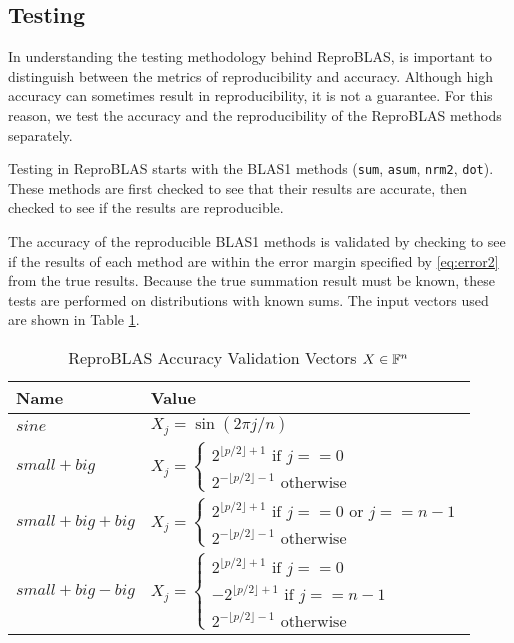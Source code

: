 \subsection{Testing}
  In understanding the testing methodology behind ReproBLAS, is important to distinguish between the metrics of reproducibility and accuracy. Although high accuracy can sometimes result in reproducibility, it is not a guarantee. For this reason, we test the accuracy and the reproducibility of the ReproBLAS methods separately.

  Testing in ReproBLAS starts with the BLAS1 methods (\texttt{sum}, \texttt{asum}, \texttt{nrm2}, \texttt{dot}). These methods are first checked to see that their results are accurate, then checked to see if the results are reproducible.

  The accuracy of the reproducible BLAS1 methods is validated by checking to see if the results of each method are within the error margin specified by \eqref{eq:error2} from the true results. Because the true summation result must be known, these tests are performed on distributions with known sums. The input vectors used are shown in Table \ref{tbl:validateblas1data}.

    \begin{table}[!htbp]
        \centering
        \begin{tabular}{ | l |  l |} \hline
            Name & Value\\ \hline
            $sine$ & $X_j = \sin(2 \pi j/n)$ \\ \hline
            $small + big$ & $X_j = \begin{cases} 2^{\lfloor p/2\rfloor + 1} \text{ if } j == 0 \\ 2^{-\lfloor p/2\rfloor - 1} \text{ otherwise} \end{cases}$ \\ \hline
            $small + big + big$ & $X_j = \begin{cases} 2^{\lfloor p/2\rfloor + 1} \text{ if } j == 0 \text{ or } j == n - 1 \\ 2^{-\lfloor p/2\rfloor - 1} \text{ otherwise} \end{cases}$\\ \hline
            $small + big - big$ & $X_j = \begin{cases} 2^{\lfloor p/2\rfloor + 1} \text{ if } j == 0\\-2^{\lfloor p/2\rfloor + 1} \text{ if } j == n - 1\\ 2^{-\lfloor p/2\rfloor - 1} \text{ otherwise} \end{cases}$\\ \hline
        \end{tabular}
        \caption{ReproBLAS Accuracy Validation Vectors $X \in \mathbb{F}^n$}
        \label{tbl:validateblas1data}
    \end{table}

